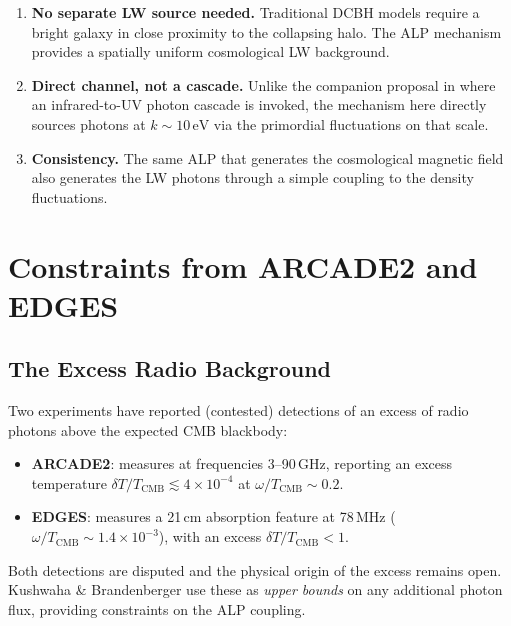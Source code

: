 \documentclass[12pt,a4paper]{report}
\newcommand{\TCMB}{T_{\mathrm{CMB}}}
\theoremstyle{definition}
\begin{document}
\begin{enumerate}[label=\roman*.]
  \item \textbf{No separate LW source needed.} Traditional DCBH models require a
    bright galaxy in close proximity to the collapsing halo. The ALP mechanism
    provides a spatially uniform cosmological LW background.
  \item \textbf{Direct channel, not a cascade.} Unlike the companion proposal
    in \cite{Jiao2025} where an infrared-to-UV photon cascade is invoked, the
    mechanism here directly sources photons at $k\sim 10\,\mathrm{eV}$ via the
    primordial fluctuations on that scale.
  \item \textbf{Consistency.} The same ALP that generates the cosmological
    magnetic field also generates the LW photons through a simple coupling to
    the density fluctuations.
\end{enumerate}

\chapter{Constraints from ARCADE2 and EDGES}
\label{chap:constraints}

\section{The Excess Radio Background}

Two experiments have reported (contested) detections of an excess of radio photons
above the expected CMB blackbody:

\begin{itemize}
  \item \textbf{ARCADE2}: measures at frequencies 3--90\,GHz, reporting an excess
    temperature $\delta T/\TCMB\lesssim 4\times10^{-4}$ at $\omega/\TCMB\sim 0.2$.
  \item \textbf{EDGES}: measures a 21\,cm absorption feature at 78\,MHz
    ($\omega/\TCMB\sim 1.4\times10^{-3}$), with an excess $\delta T/\TCMB < 1$.
\end{itemize}

Both detections are disputed and the physical origin of the excess remains open.
Kushwaha \& Brandenberger use these as \emph{upper bounds} on any additional photon
flux, providing constraints on the ALP coupling.
\end{document}

